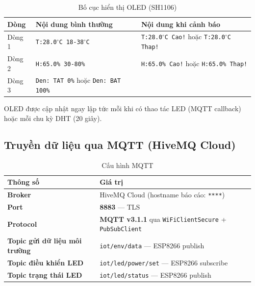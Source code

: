 \documentclass[13pt,a4paper]{article}
\newcommand{\code}[1]{\texttt{#1}}
\begin{document}
\begin{table}[htbp]
    \centering
    \caption{Bố cục hiển thị OLED (SH1106)}
    \label{tbl:oledlayout}
    \begin{tabular}{|C{2cm}|C{5cm}|C{5cm}|}
        \hline
        \textbf{Dòng} & \textbf{Nội dung bình thường} & \textbf{Nội dung khi cảnh báo} \\
        \hline
        Dòng 1 & \code{T:28.0$^\circ$C 18-38$^\circ$C} & \code{T:28.0$^\circ$C Cao!} hoặc \code{T:28.0$^\circ$C Thap!} \\
        \hline
        Dòng 2 & \code{H:65.0\% 30-80\%} & \code{H:65.0\% Cao!} hoặc \code{H:65.0\% Thap!} \\
        \hline
        Dòng 3 & \code{Den: TAT 0\%} hoặc \code{Den: BAT 100\%} & \\
        \hline
    \end{tabular}
\end{table}

OLED được cập nhật ngay lập tức mỗi khi có thao tác LED (MQTT callback) hoặc mỗi chu kỳ DHT (20 giây).

\subsection{Truyền dữ liệu qua MQTT (HiveMQ Cloud)}
\label{sec:mqtt}

\begin{table}[htbp]
    \centering
    \caption{Cấu hình MQTT}
    \label{tbl:mqtt}
    \begin{tabularx}{\textwidth}{|L{4.8cm}|Y|}
        \hline
        \textbf{Thông số} & \textbf{Giá trị} \\
        \hline
        \textbf{Broker} & HiveMQ Cloud (hostname báo cáo: \code{****}) \\
        \hline
        \textbf{Port} & \textbf{8883} --- TLS \\
        \hline
        \textbf{Protocol} & \textbf{MQTT v3.1.1} qua \code{WiFiClientSecure} + \code{PubSubClient} \\
        \hline
        \textbf{Topic gửi dữ liệu môi trường} & \code{iot/env/data} --- ESP8266 publish \\
        \hline
        \textbf{Topic điều khiển LED} & \code{iot/led/power/set} --- ESP8266 subscribe \\
        \hline
        \textbf{Topic trạng thái LED} & \code{iot/led/status} --- ESP8266 publish \\
        \hline
    \end{tabularx}
\end{table}
\end{document}
